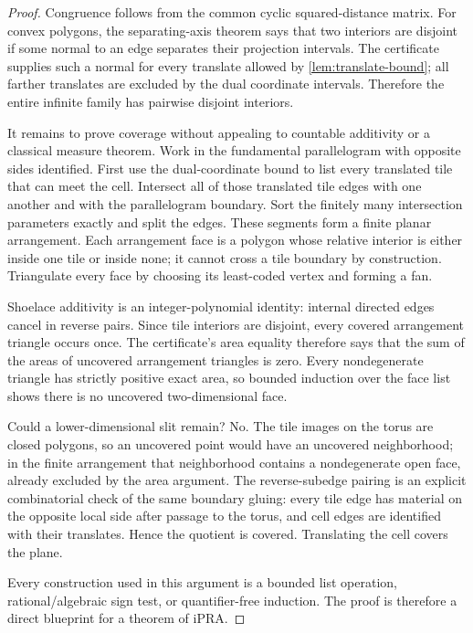 \documentclass[11pt]{article}
\theoremstyle{remark}
\newcommand{\ipra}{\mathrm{iPRA}}
\begin{document}
\begin{proof}
Congruence follows from the common cyclic squared-distance matrix.  For convex
polygons, the separating-axis theorem says that two interiors are disjoint if
some normal to an edge separates their projection intervals.  The certificate
supplies such a normal for every translate allowed by
\cref{lem:translate-bound}; all farther translates are excluded by the dual
coordinate intervals.  Therefore the entire infinite family has pairwise
disjoint interiors.

It remains to prove coverage without appealing to countable additivity or a
classical measure theorem.  Work in the fundamental parallelogram with opposite sides identified.  First
use the dual-coordinate bound to list every translated tile that can meet the
cell.  Intersect all of those translated tile edges with one another and with
the parallelogram boundary.  Sort the finitely many intersection parameters
exactly and split the edges.  These segments form a finite planar
arrangement.  Each arrangement face is a polygon whose relative interior is
either inside one tile or inside none; it cannot cross a tile boundary by
construction.  Triangulate every face by choosing its least-coded vertex and
forming a fan.

Shoelace additivity is an integer-polynomial identity: internal directed edges
cancel in reverse pairs.  Since tile interiors are disjoint, every covered
arrangement triangle occurs once.  The certificate's area equality therefore
says that the sum of the areas of uncovered arrangement triangles is zero.
Every nondegenerate triangle has strictly positive exact area, so bounded
induction over the face list shows there is no uncovered two-dimensional
face.

Could a lower-dimensional slit remain?  No.  The tile images on the torus are
closed polygons, so an uncovered point would have an uncovered neighborhood;
in the finite arrangement that neighborhood contains a nondegenerate open
face, already excluded by the area argument.  The reverse-subedge pairing is
an explicit combinatorial check of the same boundary gluing: every tile edge
has material on the opposite local side after passage to the torus, and cell
edges are identified with their translates.  Hence the quotient is covered.
Translating the cell covers the plane.

Every construction used in this argument is a bounded list operation,
rational/algebraic sign test, or quantifier-free induction.  The proof is
therefore a direct blueprint for a theorem of \(\ipra\).
\end{proof}
\end{document}
